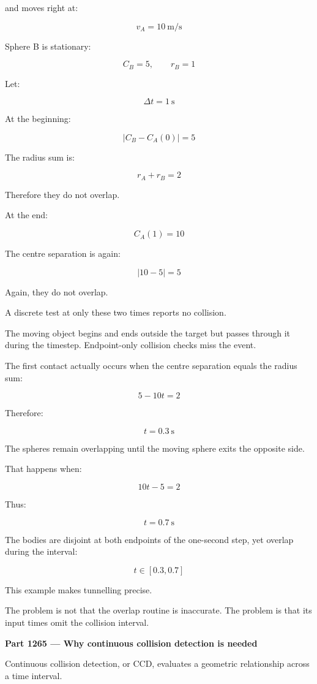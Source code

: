 and moves right at:

\[
v_A=10\ \mathrm{m/s}
\]

Sphere B is stationary:

\[
C_B=5,\qquad r_B=1
\]

Let:

\[
\Delta t=1\ \mathrm{s}
\]

At the beginning:

\[
|C_B-C_A(0)|=5
\]

The radius sum is:

\[
r_A+r_B=2
\]

Therefore they do not overlap.

At the end:

\[
C_A(1)=10
\]

The centre separation is again:

\[
|10-5|=5
\]

Again, they do not overlap.

A discrete test at only these two times reports no collision.

The moving object begins and ends outside the target but passes through it during the timestep. Endpoint-only collision checks miss the event.

The first contact actually occurs when the centre separation equals the radius sum:

\[
5-10t=2
\]

Therefore:

\[
\boxed{t=0.3\ \mathrm{s}}
\]

The spheres remain overlapping until the moving sphere exits the opposite side.

That happens when:

\[
10t-5=2
\]

Thus:

\[
\boxed{t=0.7\ \mathrm{s}}
\]

The bodies are disjoint at both endpoints of the one-second step, yet overlap during the interval:

\[
\boxed{t\in[0.3,0.7]}
\]

This example makes tunnelling precise.

The problem is not that the overlap routine is inaccurate. The problem is that its input times omit the collision interval.

\textbf{Part 1265 --- Why continuous collision detection is needed}

Continuous collision detection, or CCD, evaluates a geometric relationship across a time interval.

